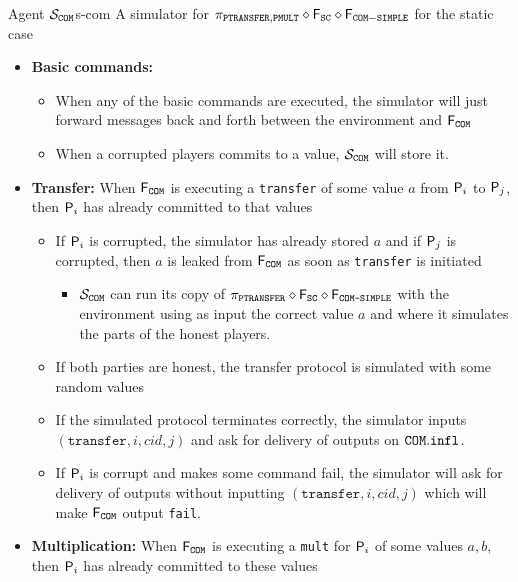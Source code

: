 \begin{protocol}{Agent $\mathcal S_{\COM}$}{s-com}
  A simulator for $\pi_{\mathtt{PTRANSFER},\mathtt{PMULT}} \diamond \F_{\mathtt{SC}} \diamond \F_{\mathtt{COM-SIMPLE}}$ for the static case
  \begin{itemize}
  	\item \textbf{Basic commands:}
    \begin{itemize}
      \item When any of the basic commands are executed, the simulator will just forward messages back and forth between the environment and $\FCOM$
      \item When a corrupted players commits to a value, $\mathcal{S}_{\COM}$ will store it.
    \end{itemize}
  	\item \textbf{Transfer:} When $\FCOM$ is executing a \texttt{transfer} of some value $a$ from $\P_i$ to $\P_j$, then $\P_i$ has already committed to that values
    \begin{itemize}
    	\item If $\P_i$ is corrupted, the simulator has already stored $a$ and if $\P_j$ is corrupted, then $a$ is leaked from $\FCOM$ as soon as \texttt{transfer} is initiated
      \begin{itemize}
        \item $\mathcal{S}_\COM$ can run its copy of $\pi_{\texttt{PTRANSFER}} \diamond \F_{\texttt{SC}} \diamond \F_{\texttt{COM-SIMPLE}}$ with the environment using as input the correct value $a$ and where it simulates the parts of the honest players. 
      \end{itemize}
      \item If both parties are honest, the transfer protocol is simulated with some random values
      \item If the simulated protocol terminates correctly, the simulator inputs $(\texttt{transfer}, i, cid, j)$ and ask for delivery of outputs on $\COM.\texttt{infl}$.
      \item If $\P_i$ is corrupt and makes some command fail, the simulator will ask for delivery of outputs without inputting $(\texttt{transfer},i,cid,j)$ which will make $\FCOM$ output \texttt{fail}. 
    \end{itemize}
  	\item \textbf{Multiplication:} When $\FCOM$ is executing a \texttt{mult} for $\P_i$ of some values $a,b$, then $\P_i$ has already committed to these values
    \begin{itemize}

\end{itemize}
\end{itemize}
\end{protocol}
